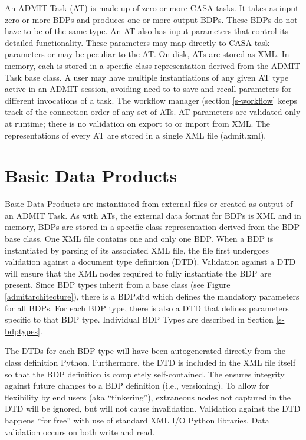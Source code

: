 \documentclass[preprint]{aastex}
\begin{document}
An ADMIT Task (AT) is made up of zero or more CASA tasks.  It takes as
input zero or more BDPs and produces one or more output BDPs.  These BDPs
do not have to be of the same type. An AT also has input parameters that
control its detailed functionality. These parameters may map directly to
CASA task parameters or may be peculiar to the AT.  On disk, ATs are stored
as XML. In memory, each is stored in a specific class representation derived
from the ADMIT Task base class.  A user may have multiple instantiations
of any given AT type active in an ADMIT session, avoiding need to to save
and recall parameters for different invocations of a task.  The workflow
manager (section \ref{s-workflow} keeps track of the connection order of
any set of ATs.   AT parameters are validated only at runtime; there is
no validation on export to or import from XML. The representations of
every AT are stored in a single XML file (admit.xml).

\section{Basic Data Products} \label{s-bdp}

Basic Data Products are instantiated from external files or created as
output of an ADMIT Task.  As with ATs, the external data format for BDPs
is XML and in memory, BDPs are stored in a specific class representation
derived from the BDP base class.  One XML file contains one and only one
BDP.  When a BDP is instantiated by parsing of its associated XML file,
the file first undergoes validation against a document type definition
(DTD).  Validation against a DTD will ensure that the XML nodes required
to fully instantiate the BDP are present.  Since BDP types inherit from
a base class (see Figure \ref{admitarchitecture}), there is a BDP.dtd
which defines the mandatory parameters for all BDPs. For each BDP type,
there is also a DTD that defines parameters specific to that BDP type.
Individual BDP Types are described in Section \ref{s-bdptypes}.

The DTDs for each BDP type will have been autogenerated directly from the
class definition Python.  Furthermore, the DTD is included in the XML file
itself so that the BDP definition is completely self-contained.  The ensures
integrity against future changes to a BDP definition (i.e., versioning).
To allow for flexibility by end users (aka ``tinkering''), extraneous nodes
not captured in the DTD will be ignored, but will not cause invalidation.
Validation against the DTD happens ``for free'' with use of standard XML
I/O Python libraries.  Data validation occurs on both write and read.
\end{document}
